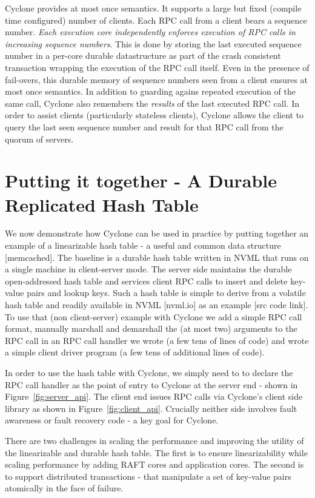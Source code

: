 \documentclass[twocolumn]{article}
\begin{document}
Cyclone provides at most once semantics. It supports a large but fixed (compile
time configured) number of clients. Each RPC call from a client bears a sequence
number. \emph{Each execution core independently enforces execution of RPC calls
  in increasing sequence numbers}. This is done by storing the last executed
sequence number in a per-core durable datastructure as part of the crash
consistent transaction wrapping the execution of the RPC call itself. Even in
the presence of fail-overs, this durable memory of sequence numbers seen from a
client ensures at most once semantics. In addition to guarding agains repeated
execution of the same call, Cyclone also remembers the \emph{results} of the
last executed RPC call. In order to assist clients (particularly stateless
clients), Cyclone allows the client to query the last seen sequence number and
result for that RPC call from the quorum of servers.

\section{Putting it together - A Durable Replicated Hash Table}
\label{sec:example}
We now demonstrate how Cyclone can be used in practice by putting together an
example of a linearizable hash table - a useful and common data structure
[memcached]. The baseline is a durable hash table written in NVML that runs on a
single machine in client-server mode. The server side maintains the durable
open-addressed hash table and services client RPC calls to insert and delete
key-value pairs and lookup keys. Such a hash table is simple to derive from a
volatile hash table and readily available in NVML [nvml.io] as an example [src
  code link]. To use that (non client-server) example with Cyclone we add a
simple RPC call format, manually marshall and demarshall the (at most two)
arguments to the RPC call in an RPC call handler we wrote (a few tens of lines
of code) and wrote a simple client driver program (a few tens of additional
lines of code).

In order to use the hash table with Cyclone, we simply need to to declare the
RPC call handler as the point of entry to Cyclone at the server end - shown in
Figure~\ref{fig:server_api}. The client end issues RPC calls via Cyclone's
client side library as shown in Figure~\ref{fig:client_api}. Crucially neither
side involves fault awareness or fault recovery code - a key goal for Cyclone.

There are two challenges in scaling the performance and improving the utility of
the linearizable and durable hash table. The first is to ensure linearizability
while scaling performance by adding RAFT cores and application cores. The second
is to support distributed transactions - that manipulate a set of key-value
pairs atomically in the face of failure.
\end{document}
